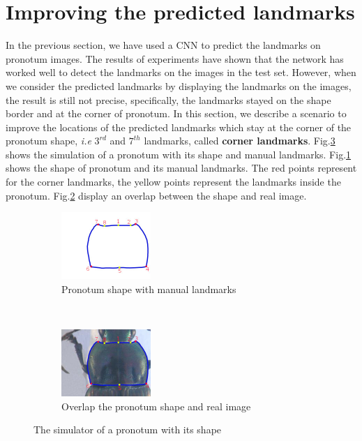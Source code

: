 \documentclass[10pt]{article}
\begin{document}
\section{Improving the predicted landmarks}
\label{secimproving}
In the previous section, we have used a CNN to predict the landmarks on pronotum images. The results of experiments have shown that the network has worked well to detect the landmarks on the images in the test set. However, when we consider the predicted landmarks by displaying the landmarks on the images, the result is still not precise, specifically, the landmarks stayed on the shape border and at the corner of pronotum. In this section, we describe a scenario to improve the locations of the predicted landmarks which stay at the corner of the pronotum shape, \textit{i.e}  $3^{rd} $ and $7^{th}$ landmarks, called \textbf{corner landmarks}. Fig.\ref{figshape} shows the simulation of a pronotum with its shape and manual landmarks. Fig.\ref{figsub11} shows the shape of pronotum and its manual landmarks. The red points represent for the corner landmarks, the yellow points represent the landmarks inside the pronotum. Fig.\ref{figsub22} display an overlap between the shape and real image.

\begin{figure}[htbp]
    \centering
    \begin{subfigure}[t]{0.25\textwidth}
        \centering
        \includegraphics[height=1in]{images/pronotum_model}
        \caption{Pronotum shape with manual landmarks}
        \label{figsub11}
    \end{subfigure}%
    ~ 
    \begin{subfigure}[t]{0.25\textwidth}
        \centering
        \includegraphics[height=1in]{images/pronotum_overlap}
        \caption{Overlap the pronotum shape and real image}
        \label{figsub22}
    \end{subfigure}
    \caption{The simulator of a pronotum with its shape } 
    \label{figshape}
\end{figure}
\end{document}
